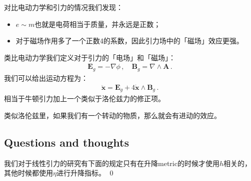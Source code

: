 \bigskip
{}

对比电动力学和引力的情况我们发现：
\begin{itemize}
  \item $ e \sim m $也就是电荷相当于质量，并永远是正数；
  \item 对于磁场作用多了一个正数4的系数，因此引力场中的「磁场」效应更强。
\end{itemize}
类比电动力学我们定义对于引力的「电场」和「磁场」：
\begin{align}
  \mathbf{E}_g = -\nabla \phi \, , \quad \mathbf{B}_g = \nabla \wedge
  \mathbf{A} \, .
\end{align}
我们可以给出运动方程为：
\begin{align}
  \ddot{\mathbf{x}} = \mathbf{E}_g + 4 \dot{\mathbf{x}} \wedge \mathbf{B}_g \, .
\end{align}
相当于牛顿引力加上一个类似于洛伦兹力的修正项。

\bigskip
{}

类似洛伦兹里，如果我们有一个转动的物质，那么就会有进动的效应。

\YL{[回头仔细补充捏]}

\subsection{Questions and thoughts}


我们对于线性引力的研究有下面的规定只有在升降metric的时候才使用$ h $相关的，其他时候都使用$ \eta $进行升降指标。
\qed
